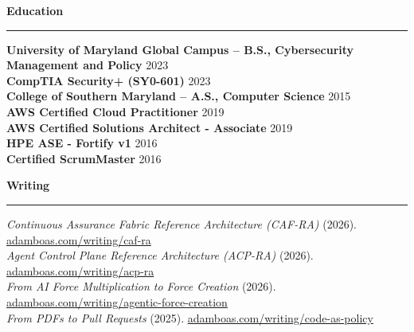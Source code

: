 \documentclass[10pt]{article}
\newcommand{\ResumeSection}[1]{\vspace{0.16em}\noindent\textbf{\large #1}\par\nointerlineskip\textcolor{accentgold}{\rule{\textwidth}{0.75pt}}\vspace{-0.08em}}
\begin{document}
\ResumeSection{Education}
{\setlength{\parskip}{0.06em}
\textbf{University of Maryland Global Campus -- B.S., Cybersecurity Management and Policy} \hfill 2023\\
\textbf{CompTIA Security+ (SY0-601)} \hfill 2023\\
\textbf{College of Southern Maryland -- A.S., Computer Science} \hfill 2015\\
\textbf{AWS Certified Cloud Practitioner} \hfill 2019\\
\textbf{AWS Certified Solutions Architect - Associate} \hfill 2019\\
\textbf{HPE ASE - Fortify v1} \hfill 2016\\
\textbf{Certified ScrumMaster} \hfill 2016\\
}

\ResumeSection{Writing}
{\footnotesize\setlength{\parskip}{0.00em}
\textit{Continuous Assurance Fabric Reference Architecture (CAF-RA)} (2026). \href{https://www.adamboas.com/writing/caf-ra/}{adamboas.com/writing/caf-ra}\\
\textit{Agent Control Plane Reference Architecture (ACP-RA)} (2026). \href{https://www.adamboas.com/writing/acp-ra/}{adamboas.com/writing/acp-ra}\\
\textit{From AI Force Multiplication to Force Creation} (2026). \href{https://www.adamboas.com/writing/agentic-force-creation/}{adamboas.com/writing/agentic-force-creation}\\
\textit{From PDFs to Pull Requests} (2025). \href{https://www.adamboas.com/writing/code-as-policy/}{adamboas.com/writing/code-as-policy}
}
\end{document}
